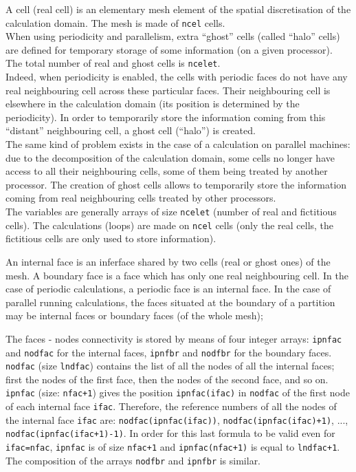 {{{
A cell (real cell) is an elementary mesh element of the spatial
discretisation of the calculation domain. The mesh is made of \texttt{ncel} cells.\\
When using periodicity and parallelism, extra ``ghost'' cells
(called ``halo'' cells) are defined for temporary storage of some information
(on a given processor).
The total number of real and ghost cells is \texttt{ncelet}. \\
\hspace*{1cm} Indeed, when periodicity is enabled, the cells with
periodic faces do not have any real neighbouring cell across these
particular faces. Their neighbouring cell is elsewhere in the calculation
domain (its position is determined by the periodicity). In order to
temporarily store the information coming from this ``distant''
neighbouring cell, a ghost cell (``halo'') is created. \\
\hspace*{1cm} The same kind of problem exists in the case of a
calculation on parallel machines: due to the decomposition of the
calculation domain, some cells no longer have access to all
their neighbouring cells, some of them being treated by another processor. The
creation of ghost cells allows to temporarily store the information
coming from real neighbouring cells treated by other processors.\\
The variables are generally arrays of size \texttt{ncelet} (number of real and
fictitious cells). The calculations (loops) are made on \texttt{ncel} cells (only
the real cells, the fictitious cells are only used to store information).

An internal face is an inferface shared by two cells (real or ghost
ones) of the mesh. A boundary face is a face which has only one real
neighbouring cell. In the case of periodic calculations, a periodic face
is an internal face. In the case of parallel running calculations, the
faces situated at the boundary of a partition may be internal faces or
boundary faces (of the whole mesh);

\label{sec:prg_nodfac}
The faces - nodes connectivity is stored by
means of four integer arrays: \texttt{ipnfac} and \texttt{nodfac} for the
internal faces, \texttt{ipnfbr} and \texttt{nodfbr} for the boundary faces.
\texttt{nodfac} (size \texttt{lndfac})
contains the list of all the nodes of all the internal faces; first the nodes of
the first face, then the nodes of the second face, and so on.
\texttt{ipnfac} (size: \texttt{nfac+1}) gives the position \texttt{ipnfac(ifac)}
in \texttt{nodfac} of the first node of each internal face \texttt{ifac}.
Therefore, the reference numbers of all
the nodes of the internal face \texttt{ifac} are: \texttt{nodfac(ipnfac(ifac))},
\texttt{nodfac(ipnfac(ifac)+1)}, ..., \texttt{nodfac(ipnfac(ifac+1)-1)}.
In order for this last formula to be valid even for \texttt{ifac=nfac},
\texttt{ipnfac} is of size \texttt{nfac+1} and \texttt{ipnfac(nfac+1)}
is equal to \texttt{lndfac+1}.\\
The composition of the arrays \texttt{nodfbr} and \texttt{ipnfbr} is similar.

}}}
